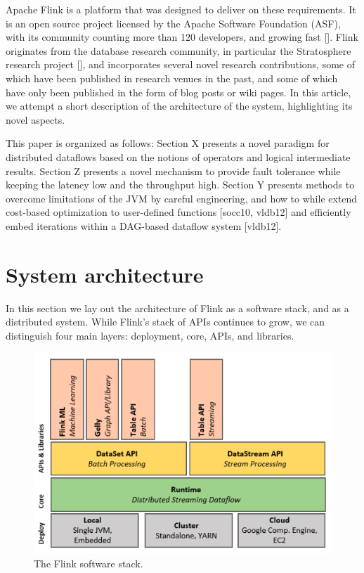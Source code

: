 \documentclass{sig-alternate}
\begin{document}
Apache Flink is a platform that was designed to deliver on these requirements. It is an open source project licensed by the Apache Software Foundation (ASF), with its community counting more than 120 developers, and growing fast []. Flink originates from the database research community, in particular the Stratosphere research project [], and incorporates several novel research contributions, some of which have been published in research venues in the past, and some of which have only been published in the form of blog posts or wiki pages. In this article, we attempt a short description of the architecture of the system, highlighting its novel aspects.

This paper is organized as follows: Section X presents a novel paradigm for distributed dataflows based on the notions of operators and logical intermediate results. Section Z presents a novel mechanism to provide fault tolerance while keeping the latency low and the throughput high. Section Y presents methods to overcome limitations of the JVM by careful engineering, and how to while extend cost-based optimization to user-defined functions [socc10, vldb12] and efficiently embed iterations within a DAG-based dataflow system [vldb12]. 


\section{System architecture}

In this section we lay out the architecture of Flink as a software stack, and as a distributed system. While Flink's stack of APIs continues to grow, we can distinguish four main layers: deployment, core, APIs, and libraries.

\begin{figure}[h!]
	\centering  	
  	\includegraphics[width=.45\textwidth]{figs/flink_stack.png}
	\caption{The Flink software stack.}
	\label{fig:FlinkStack}
\end{figure}
\end{document}
